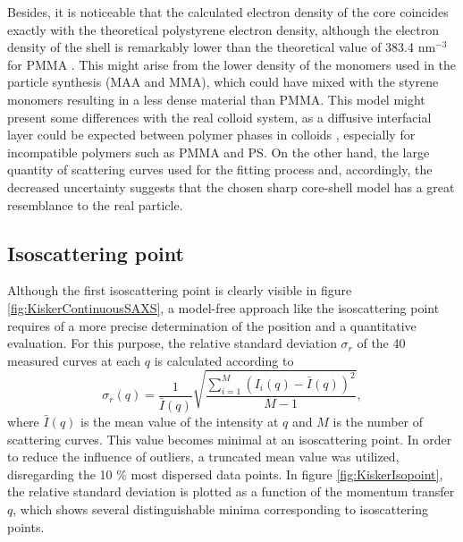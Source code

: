 Besides, it is noticeable that the calculated electron density of the core coincides exactly with the theoretical polystyrene electron density, although the electron density of the shell is remarkably lower than the theoretical value of 383.4 nm\(^{-3}\) for PMMA \citep{ballauff_saxs_2001-1}. This might arise from the lower density of the monomers used in the particle synthesis (MAA and MMA), which could have mixed with the styrene monomers resulting in a less dense material than PMMA. This model might present some differences with the real colloid system, as a diffusive interfacial layer could be expected between polymer phases in colloids \citep{dingenouts_interface_1994}, especially for incompatible polymers such as PMMA and PS. On the other hand, the large quantity of scattering curves used for the fitting process and, accordingly, the decreased uncertainty suggests that the chosen sharp core-shell model has a great resemblance to the real particle.

\subsection{Isoscattering point}

Although the first isoscattering point is clearly visible in figure \ref{fig:KiskerContinuousSAXS}, a model-free approach like the isoscattering point requires of a more precise determination of the position and a quantitative evaluation. For this purpose, the relative standard deviation $\sigma_r$ of the 40 measured curves at each \(q\) is calculated according to
\begin{equation}
\sigma_r (q)=\frac{1}{\bar{I}(q)}\sqrt{\frac{\sum^{M}_{i=1} (I_i(q) -\bar{I} (q))^2 }{M-1}} ,
\end{equation}
where \(\bar{I} (q)\) is the mean value of the intensity at \(q\) and \( M \) is the number of scattering curves. This value becomes minimal at an isoscattering point. In order to reduce the influence of outliers, a truncated mean value was utilized, disregarding the 10 $\%$ most dispersed data points. In figure \ref{fig:KiskerIsopoint}, the relative standard deviation is plotted as a function of the momentum transfer \(q\), which shows several distinguishable minima corresponding to isoscattering points.

%		

